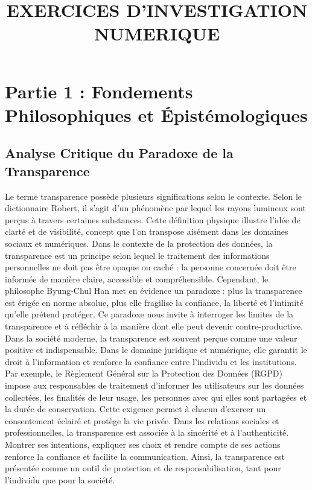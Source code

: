 \documentclass[12pt,a4paper]{report}
\title{EXERCICES D'INVESTIGATION NUMERIQUE}
\date{}
\begin{document}
	
	\maketitle
	
\newpage

	\section*{Partie 1 : Fondements Philosophiques et Épistémologiques}
	
	\subsection*{Analyse Critique du Paradoxe de la Transparence}
		Le terme transparence possède plusieurs significations selon le contexte. Selon le dictionnaire Robert, il s’agit d’un phénomène par lequel les rayons lumineux sont perçus à travers certaines substances. Cette définition physique illustre l’idée de clarté et de visibilité, concept que l’on transpose aisément dans les domaines sociaux et numériques. Dans le contexte de la protection des données, la transparence est un principe selon lequel le traitement des informations personnelles ne doit pas être opaque ou caché : la personne concernée doit être informée de manière claire, accessible et compréhensible. Cependant, le philosophe Byung-Chul Han met en évidence un paradoxe : plus la transparence est érigée en norme absolue, plus elle fragilise la confiance, la liberté et l’intimité qu’elle prétend protéger. Ce paradoxe nous invite à interroger les limites de la transparence et à réfléchir à la manière dont elle peut devenir contre-productive.\\
	
	Dans la société moderne, la transparence est souvent perçue comme une valeur positive et indispensable. Dans le domaine juridique et numérique, elle garantit le droit à l’information et renforce la confiance entre l’individu et les institutions. Par exemple, le Règlement Général sur la Protection des Données (RGPD) impose aux responsables de traitement d’informer les utilisateurs sur les données collectées, les finalités de leur usage, les personnes avec qui elles sont partagées et la durée de conservation. Cette exigence permet à chacun d’exercer un consentement éclairé et protège la vie privée.
	Dans les relations sociales et professionnelles, la transparence est associée à la sincérité et à l’authenticité. Montrer ses intentions, expliquer ses choix et rendre compte de ses actions renforce la confiance et facilite la communication. Ainsi, la transparence est présentée comme un outil de protection et de responsabilisation, tant pour l’individu que pour la société.\\
	
\end{document}
